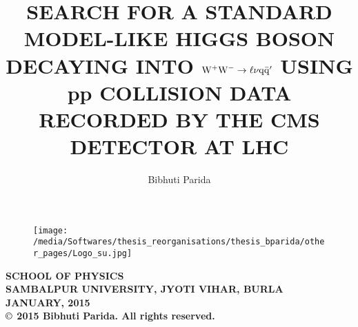 \begin{singlespacing}
%
%
\title{SEARCH FOR A STANDARD MODEL-LIKE HIGGS BOSON DECAYING INTO  $\rm {W^{+}W^{-}\rightarrow \ell\nu q\bar q^{\prime}}$ USING pp COLLISION DATA RECORDED BY THE CMS DETECTOR AT LHC}
%
%
\author{Bibhuti Parida}
\maketitle
\vspace{.1cm}
\begin{figure}[h]
\centering
\texttt{[image: /media/Softwares/thesis\_reorganisations/thesis\_bparida/other\_pages/Logo\_su.jpg]}
\end{figure}
\begin{center}
{\large {\bf SCHOOL OF PHYSICS}}\\
\vspace{.12cm}
{\large {\bf SAMBALPUR UNIVERSITY, JYOTI VIHAR, BURLA}}\\
\vspace{.12cm}
{\large {\bf JANUARY, 2015}}\\
\vspace{.22cm}
{\bf $\copyright$ 2015 Bibhuti Parida. All rights reserved.}

\end{center}

\end{singlespacing}

